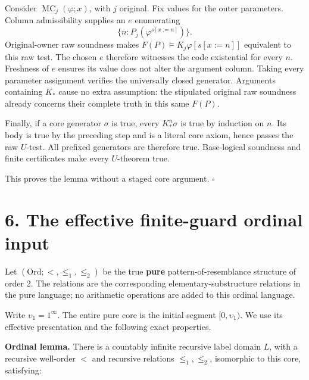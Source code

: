 \documentclass[
  11pt,
  letterpaper,
]{article}
\begin{document}
Consider \(\operatorname{MC}_j(\varphi;x)\), with \(j\) original. Fix
values for the outer parameters. Column admissibility supplies an \(e\)
enumerating \[
\{n:P_j(\varphi^{s[x:=n]})\}.
\] Original-owner raw soundness makes
\(F(P)\models K_j\varphi[s[x:=n]]\) equivalent to this raw test. The
chosen \(e\) therefore witnesses the code existential for every \(n\).
Freshness of \(e\) ensures its value does not alter the argument column.
Taking every parameter assignment verifies the universally closed
generator. Arguments containing \(K_*\) cause no extra assumption: the
stipulated original raw soundness already concerns their complete truth
in this same \(F(P)\).

Finally, if a core generator \(\sigma\) is true, every \(K_*^n\sigma\)
is true by induction on \(n\). Its body is true by the preceding step
and is a literal core axiom, hence passes the raw \(U\)-test. All
prefixed generators are therefore true. Base-logical soundness and
finite certificates make every \(U\)-theorem true.

This proves the lemma without a staged core argument. \(\square\)

\section{6. The effective finite-guard ordinal
input}\label{the-effective-finite-guard-ordinal-input}

Let \((\mathrm{Ord};<,\leq_1,\leq_2)\) be the true \textbf{pure}
pattern-of-resemblance structure of order 2. The relations are the
corresponding elementary-substructure relations in the pure language; no
arithmetic operations are added to this ordinal language.

Write \(\upsilon_1=1^\infty\). The entire pure core is the initial
segment \([0,\upsilon_1)\). We use its effective presentation and the
following exact properties.

\textbf{Ordinal lemma.} There is a countably infinite recursive label
domain \(L\), with a recursive well-order \(<\) and recursive relations
\(\leq_1,\leq_2\), isomorphic to this core, satisfying:
\end{document}
